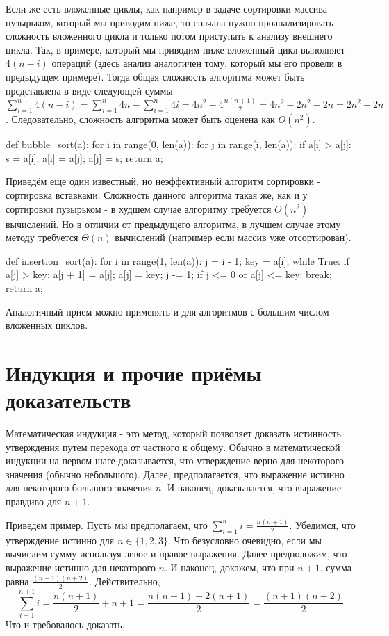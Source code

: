 Если же есть вложенные циклы, как например в задаче сортировки массива пузырьком, 
который мы приводим ниже, то сначала нужно проанализировать сложность 
вложенного цикла и только потом приступать к анализу внешнего цикла. Так, в примере,
который мы приводим ниже вложенный цикл выполняет $4(n-i)$ операций 
(здесь анализ аналогичен тому, который мы его 
провели в предыдущем примере). Тогда общая сложность
алгоритма может быть представлена в виде следующей суммы 
$\sum_{i=1}^n4(n-i) = \sum_{i=1}^n4n - \sum_{i=1}^n4i = 4n^2 - 4\frac{n(n+1)}{2} = 4n^2-2n^2 - 2n=2n^2 - 2n$.
Следовательно, сложность алгоритма может быть оценена как $O(n^2)$.

\begin{python}
def bubble_sort(a):
	for i in range(0, len(a)):
		for j in range(i, len(a)):
			if a[i] > a[j]:
				s = a[i];
				a[i] = a[j];
				a[j] = s;
	return a;
\end{python}

Приведём еще один известный, но неэффективный алгоритм сортировки - сортировка вставками. Сложность
данного алгоритма такая же, как и у сортировки пузырьком - в худшем случае алгоритму требуется $O(n^2)$
вычислений. Но в отличии от предыдущего алгоритма, в лучшем случае этому методу требуется $\Theta(n)$ вычислений
(например если массив уже отсортирован).

\begin{python}
def insertion_sort(a):
	for i in range(1, len(a)):
		j = i - 1;
		key = a[i];
		while True:
			if a[j] > key:
				a[j + 1] = a[j];				
				a[j] = key;
				j -= 1;
			if j <= 0 or a[j] <= key:
				break;
	return a;
\end{python}


Аналогичный прием можно применять и для алгоритмов с большим числом вложенных
циклов.

\section{Индукция и прочие приёмы доказательств}

Математическая индукция - это метод, который позволяет доказать истинность утверждения
путем перехода от частного к общему. Обычно в математической индукции на первом шаге
доказывается, что утверждение верно для некоторого значения (обычно небольшого). Далее,
предполагается, что выражение истинно для некоторого большого значения $n$. И наконец, 
доказывается, что выражение правдиво для $n+1$.

Приведем пример. Пусть мы предполагаем, что $\sum_{i=1}^n i=\frac{n(n+1)}{2}$. Убедимся, что утверждение
истинно для $n \in \{1, 2, 3\}$. Что безусловно очевидно, если мы вычислим сумму используя левое и правое выражения.
Далее предположим, что выражение истинно для некоторого $n$. И наконец, докажем, что при $n+1$, сумма равна $\frac{(n+1)(n+2)}{2}$. Действительно, $$\sum_{i=1}^{n+1} i=\frac{n(n+1)}{2} + n+1 = \frac{n(n+1) + 2(n+1)}{2} = \frac{(n+1)(n+2)}{2}$$ Что и требовалось доказать.

